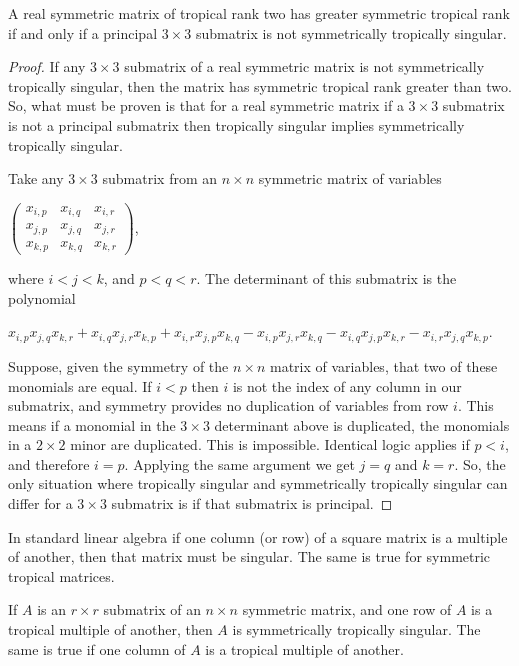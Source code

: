 \documentclass{article}
\begin{document}
\begin{prop}
  A real symmetric matrix of tropical rank two has greater symmetric tropical rank if and only if a principal $3 \times 3$ submatrix is not symmetrically tropically singular.
\end{prop}

\begin{proof}
  If any $3 \times 3$ submatrix of a real symmetric matrix is not symmetrically tropically singular, then the matrix has symmetric tropical rank greater than two. So, what must be proven is that for a real symmetric matrix if a $3 \times 3$ submatrix is not a principal submatrix then tropically singular implies symmetrically tropically singular.
  
  Take any $3 \times 3$ submatrix from an $n \times n$ symmetric matrix of variables
  \begin{center}
    $\left(\begin{array}{ccc} x_{i,p} & x_{i,q} & x_{i,r} \\ x_{j,p} & x_{j,q} & x_{j,r} \\ x_{k,p} & x_{k,q} & x_{k,r} \end{array}\right)$,
  \end{center}
  where $i < j < k$, and $p < q < r$. The determinant of this submatrix is the polynomial
  \begin{center}
    $x_{i,p}x_{j,q}x_{k,r} + x_{i,q}x_{j,r}x_{k,p} + x_{i,r}x_{j,p}x_{k,q} - x_{i,p}x_{j,r}x_{k,q} - x_{i,q}x_{j,p}x_{k,r} - x_{i,r}x_{j,q}x_{k,p}$.
  \end{center}
  Suppose, given the symmetry of the $n \times n$ matrix of variables, that two of these monomials are equal. If $i < p$ then $i$ is not the index of any column in our submatrix, and symmetry provides no duplication of variables from row $i$. This means if a monomial in the $3 \times 3$ determinant above is duplicated, the monomials in a $2 \times 2$ minor are duplicated. This is impossible. Identical logic applies if $p < i$, and therefore $i = p$. Applying the same argument we get $j = q$ and $k = r$. So, the only situation where tropically singular and symmetrically tropically singular can differ for a $3 \times 3$ submatrix is if that submatrix is principal.
\end{proof}

In standard linear algebra if one column (or row) of a square matrix is a multiple of another, then that matrix must be singular. The same is true for symmetric tropical matrices.

\begin{prop}
  If $A$ is an $r \times r$ submatrix of an $n \times n$ symmetric matrix, and one row of $A$ is a tropical multiple of another, then $A$ is symmetrically tropically singular. The same is true if one column of $A$ is a tropical multiple of another.
\end{prop}
\end{document}
